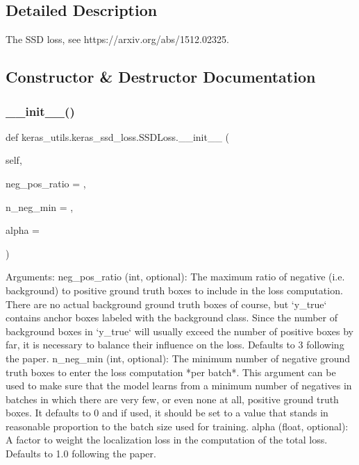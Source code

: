 \subsection{Detailed Description}
\begin{DoxyVerb}The SSD loss, see https://arxiv.org/abs/1512.02325.
\end{DoxyVerb}
 

\subsection{Constructor \& Destructor Documentation}
\mbox{\label{classkeras__utils_1_1keras__ssd__loss_1_1_s_s_d_loss_a2689ede880461cb86574c15d98d200f2}} 
\subsubsection{\texorpdfstring{\+\_\+\+\_\+init\+\_\+\+\_\+()}{\_\_init\_\_()}}
{\footnotesize\ttfamily def keras\+\_\+utils.\+keras\+\_\+ssd\+\_\+loss.\+S\+S\+D\+Loss.\+\_\+\+\_\+init\+\_\+\+\_\+ (\begin{DoxyParamCaption}\item[{}]{self,  }\item[{}]{neg\+\_\+pos\+\_\+ratio = {},  }\item[{}]{n\+\_\+neg\+\_\+min = {},  }\item[{}]{alpha = {} }\end{DoxyParamCaption})}

\begin{DoxyVerb}Arguments:
    neg_pos_ratio (int, optional): The maximum ratio of negative (i.e. background)
to positive ground truth boxes to include in the loss computation.
There are no actual background ground truth boxes of course, but `y_true`
contains anchor boxes labeled with the background class. Since
the number of background boxes in `y_true` will usually exceed
the number of positive boxes by far, it is necessary to balance
their influence on the loss. Defaults to 3 following the paper.
    n_neg_min (int, optional): The minimum number of negative ground truth boxes to
enter the loss computation *per batch*. This argument can be used to make
sure that the model learns from a minimum number of negatives in batches
in which there are very few, or even none at all, positive ground truth
boxes. It defaults to 0 and if used, it should be set to a value that
stands in reasonable proportion to the batch size used for training.
    alpha (float, optional): A factor to weight the localization loss in the
computation of the total loss. Defaults to 1.0 following the paper.
\end{DoxyVerb}
 

